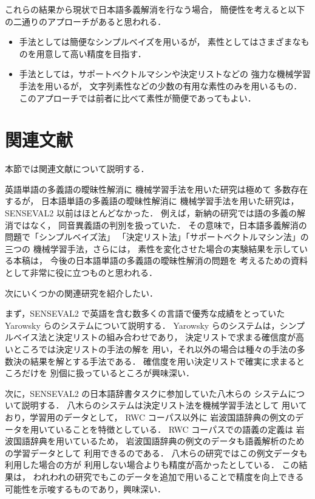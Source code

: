 これらの結果から現状で日本語多義解消を行なう場合，
簡便性を考えると以下の二通りのアプローチがあると思われる．
\begin{itemize}
\item 
  手法としては簡便なシンプルベイズを用いるが，
  素性としてはさまざまなものを用意して高い精度を目指す．
  
\item 
  手法としては，サポートベクトルマシンや決定リストなどの
  強力な機械学習手法を用いるが，
  文字列素性などの少数の有用な素性のみを用いるもの．
  このアプローチでは前者に比べて素性が簡便であってもよい．
  
\end{itemize}

\section{関連文献}
\label{ref:kanren}

本節では関連文献について説明する．

英語単語の多義語の曖昧性解消に
機械学習手法を用いた研究は極めて
多数存在する\cite{Fuji98a,sense1,fukumoto_ipsj2001}が，
日本語単語の多義語の曖昧性解消に
機械学習手法を用いた研究は，
SENSEVAL2 以前はほとんどなかった\cite{shinou98}．
例えば，新納の研究では語の多義の解消ではなく，
同音異義語の判別を扱っていた．
その意味で，日本語多義解消の問題で「シンプルベイズ法」
「決定リスト法」「サポートベクトルマシン法」の三つの
機械学習手法，さらには，
素性を変化させた場合の実験結果を示している本稿は，
今後の日本語単語の多義語の曖昧性解消の問題を
考えるための資料として非常に役に立つものと思われる．

次にいくつかの関連研究を紹介したい．

まず，SENSEVAL2 で英語を含む数多くの言語で優秀な成績をとっていた
Yarowsky らのシステム\cite{yarowsky_s2}について説明する．
Yarowsky らのシステムは，シンプルベイス法と決定リストの組み合わせであり，
決定リストで求まる確信度が高いところでは決定リストの手法の解を
用い，それ以外の場合は種々の手法の多数決の結果を解とする手法である．
確信度を用い決定リストで確実に求まるところだけを
別個に扱っているところが興味深い．

次に，SENSEVAL2 の日本語辞書タスクに参加していた八木らの
システム\cite{yagi_nlc2001}について説明する．
八木らのシステムは決定リスト法を機械学習手法として
用いており，学習用のデータとして，
RWC コーパス以外に
岩波国語辞典の例文のデータを用いていることを特徴としている．
RWC コーパスでの語義の定義は
岩波国語辞典を用いているため，
岩波国語辞典の例文のデータも語義解析のための学習データとして
利用できるのである．
八木らの研究ではこの例文データも利用した場合の方が
利用しない場合よりも精度が高かったとしている．
この結果は，
われわれの研究でもこのデータを追加で用いることで精度を向上できる
可能性を示唆するものであり，興味深い．

